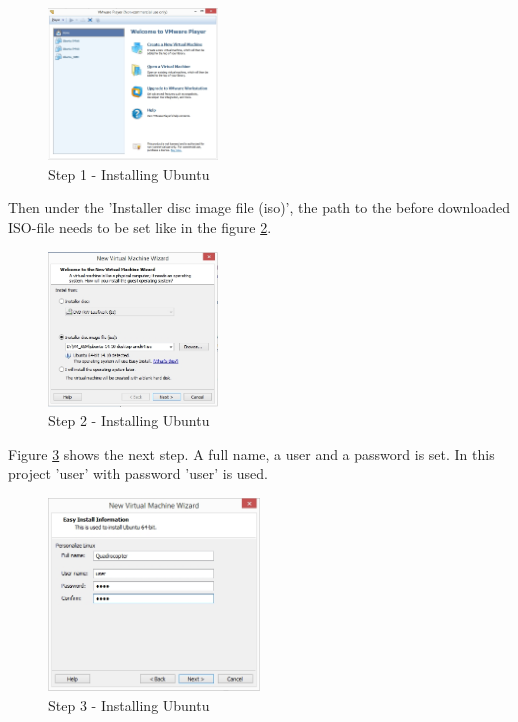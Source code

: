 \begin{figure}[H]
	\centering\includegraphics[width=0.4\textwidth]{fig/Ub1.jpg}
	\caption{Step 1 - Installing Ubuntu}
	\label{fig:Ub1}
\end{figure}

Then under the 'Installer disc image file (iso)', the path to the before downloaded ISO-file needs to be set like in the figure \ref{fig:Ub2}.

\begin{figure}[H]
	\centering\includegraphics[width=0.4\textwidth]{fig/Ub2.jpg}
	\caption{Step 2 - Installing Ubuntu}
	\label{fig:Ub2}
\end{figure}

Figure \ref{fig:Ub3} shows the next step. A full name, a user and a password is set. In this project 'user' with password 'user' is used.

\begin{figure}[H]
	\centering\includegraphics[width=0.5\textwidth]{fig/Ub3.jpg}
	\caption{Step 3 - Installing Ubuntu}
	\label{fig:Ub3}
\end{figure}

